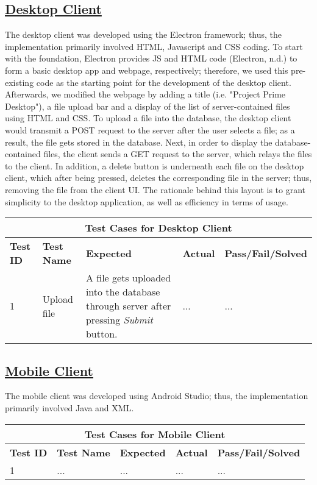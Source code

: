 \documentclass{article}
\begin{document}
\subsection{\underline{Desktop Client}}
The desktop client was developed using the Electron framework; thus, the implementation primarily involved HTML, Javascript and CSS coding. To start with the foundation, Electron provides JS and HTML code (Electron, n.d.) to form a basic desktop app and webpage, respectively; therefore, we used this pre-existing code as the starting point for the development of the desktop client. Afterwards, we modified the webpage by adding a title (i.e. "Project Prime Desktop"), a file upload bar and a display of the list of server-contained files using HTML and CSS. To upload a file into the database, the desktop client would transmit a POST request to the server after the user selects a file; as a result, the file gets stored in the database. Next, in order to display the database-contained files, the client sends a GET request to the server, which relays the files to the client. In addition, a delete button is underneath each file on the desktop client, which after being pressed, deletes the corresponding file in the server; thus, removing the file from the client UI. The rationale behind this layout is to grant simplicity to the desktop application, as well as efficiency in terms of usage. 

\begin{tabular}{|p{2cm}|p{2cm}|p{3cm}|p{3cm}|p{3cm}|}
\hline
\multicolumn{5}{|c|}{\textbf{Test Cases for Desktop Client}} \\
\hline
\textbf{Test ID} & \textbf{Test Name} & \textbf{Expected} & \textbf{Actual} & \textbf{Pass/Fail/Solved} \\
\hline
1 & Upload file & A file gets uploaded into the database through server after pressing \textit{Submit} button. & ... & ... \\
\hline
\end{tabular}

\subsection{\underline{Mobile Client}}
The mobile client was developed using Android Studio; thus, the implementation primarily involved Java and XML.

\begin{tabular}{|p{2cm}|p{2cm}|p{3cm}|p{3cm}|p{3cm}|}
\hline
\multicolumn{5}{|c|}{\textbf{Test Cases for Mobile Client}} \\
\hline
\textbf{Test ID} & \textbf{Test Name} & \textbf{Expected} & \textbf{Actual} & \textbf{Pass/Fail/Solved} \\
\hline
1 & ... & ... & ... & ... \\
\hline
\end{tabular}
\end{document}
